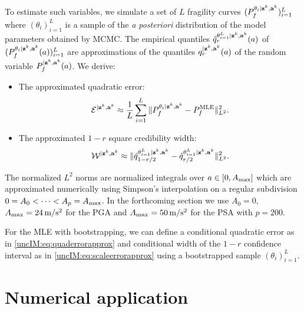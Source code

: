     To estimate such variables, we simulate a set of $L$ %
    fragility curves $( P_f^{\theta_i|\mbf z^k,\mbf a^k})_{i=1}^L\vspace*{-4pt}$ where $(\theta_i)_{i=1}^L$ is a sample of the \emph{a posteriori} distribution of the model parameters obtained by MCMC. The   empirical quantiles $\hat q_r^{\theta_{i=1}^L|\mathbf{z}^k,\mathbf{a}^k}(a)$  of $( P_f^{\theta_i|\mathbf{z}^k,\mathbf{a}^k}(a))_{i=1}^L$  are approximations of the quantiles $q_r^{|\mathbf{z}^k,\mathbf{a}^k}(a)$ of the random variable $P_f^{|\mathbf{z}^k,\mathbf{a}^k}(a)$.
    We derive\vspace*{-4pt}:
        \begin{itemize}
            \item The approximated quadratic error:
                \begin{equation} \label{uncIM:eq:quaderrorapprox}
                    \mathcal{E}^{|\mathbf{z}^k,\mathbf{a}^k} \approx\frac{1}{ L}\sum_{i=1}^L\| P_{f}^{\theta_i|\mathbf{z}^k,\mathbf{a}^k} - P_f^{\mathrm{MLE}} \|_{L^2}^2.
                \end{equation}
            \item The approximated $1-r$ square credibility width: %
                \begin{equation} \label{uncIM:eq:scaleerrorapprox}
                    \mathcal{W}^{|\mathbf{z}^k,\mathbf{a}^k} \approx \|\hat q_{1-{r/2}}^{\theta_{i=1}^L|\mathbf{z}^k,\mathbf{a}^k} - \hat q_{{r/2}}^{\theta_{i=1}^L|\mathbf{z}^k,\mathbf{a}^k} \|_{L^2}^2.
                \end{equation}
        \end{itemize}
        The normalized $L^2$ norms are normalized integrals over $a\in [0,A_{\rm max}]$ which are approximated numerically using Simpson's interpolation on a regular subdivision $0=A_0<\dots<A_p=A_{\rm max}$. In the forthcoming section we use   $A_0=0$, $A_{\rm max}=24\,\mathrm{m/s^2}$ for the PGA and $A_{\rm max}=50\,\mathrm{m/s^2}$ for the PSA with $p=200$.

        For the MLE with bootstrapping, we can define a conditional quadratic error as in \cref{uncIM:eq:quaderrorapprox} and conditional width of the $1-r$ confidence interval as in \cref{uncIM:eq:scaleerrorapprox} using a bootstrapped sample $(\theta_i)_{i=1}^L$.


\section{Numerical application} \label{uncIM:sec:application}

